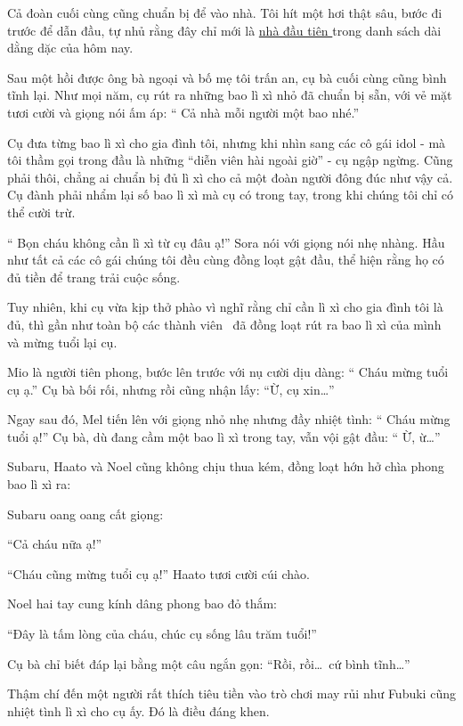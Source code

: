 \documentclass[../main.tex]{subfiles}
\begin{document}
Cả đoàn cuối cùng cũng chuẩn bị để vào nhà. Tôi hít một hơi thật sâu, bước đi trước để dẫn đầu, tự nhủ rằng đây chỉ mới là \uline{nhà đầu tiên }trong danh sách dài dằng dặc của hôm nay.

\ct

Sau một hồi được ông bà ngoại và bố mẹ tôi trấn an, cụ bà cuối cùng cũng bình tĩnh lại. Như mọi năm, cụ rút ra những bao lì xì nhỏ đã chuẩn bị sẵn, với vẻ mặt tươi cười và giọng nói ấm áp: ``{\color{red} Cả nhà mỗi người một bao nhé.}''

Cụ đưa từng bao lì xì cho gia đình tôi, nhưng khi nhìn sang các cô gái idol - mà tôi thầm gọi trong đầu là những ``diễn viên hài ngoài giờ'' - cụ ngập ngừng. Cũng phải thôi, chẳng ai chuẩn bị đủ lì xì cho cả một đoàn người đông đúc như vậy cả. Cụ đành phải nhẩm lại số bao lì xì mà cụ có trong tay, trong khi chúng tôi chỉ có thể cười trừ.

``{\color{red} Bọn cháu không cần lì xì từ cụ đâu ạ!}'' Sora nói với giọng nói nhẹ nhàng. Hầu như tất cả các cô gái chúng tôi đều cùng đồng loạt gật đầu, thể hiện rằng họ có đủ tiền để trang trải cuộc sống.

Tuy nhiên, khi cụ vừa kịp thở phào vì nghĩ rằng chỉ cần lì xì cho gia đình tôi là đủ, thì gần như toàn bộ các thành viên \hll\ đã đồng loạt rút ra bao lì xì của mình và mừng tuổi lại cụ.

Mio là người tiên phong, bước lên trước với nụ cười dịu dàng: ``{\color{red} Cháu mừng tuổi cụ ạ.}'' Cụ bà bối rối, nhưng rồi cũng nhận lấy: ``Ừ, cụ xin\dots''

Ngay sau đó, Mel tiến lên với giọng nhỏ nhẹ nhưng đầy nhiệt tình: ``{\color{red} Cháu mừng tuổi ạ!}'' Cụ bà, dù đang cầm một bao lì xì trong tay, vẫn vội gật đầu: ``{\color{red} Ừ, ừ\dots}''

Subaru, Haato và Noel cũng không chịu thua kém, đồng loạt hớn hở chìa phong bao lì xì ra:

Subaru oang oang cất giọng:

{\color{red}``Cả cháu nữa ạ!}''

{\color{red}``Cháu cũng mừng tuổi cụ ạ!''} Haato tươi cười cúi chào.

Noel hai tay cung kính dâng phong bao đỏ thắm:

{\color{red}``Đây là tấm lòng của cháu, chúc cụ sống lâu trăm tuổi!''}

Cụ bà chỉ biết đáp lại bằng một câu ngắn gọn: ``{\color{red}Rồi, rồi\dots\ cứ bình tĩnh\dots}''

Thậm chí đến một người rất thích tiêu tiền vào trò chơi may rủi như Fubuki cũng nhiệt tình lì xì cho cụ ấy. Đó là điều đáng khen.
\end{document}
